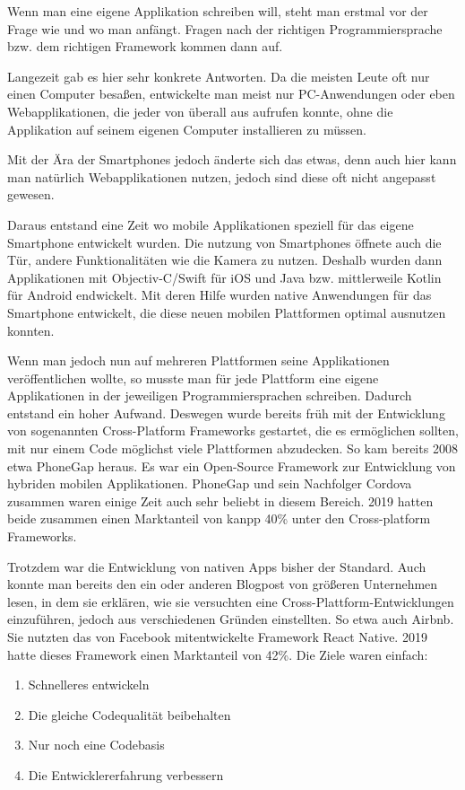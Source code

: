 Wenn man eine eigene Applikation schreiben will, steht man erstmal vor der Frage wie und wo man anfängt.
Fragen nach der richtigen Programmiersprache bzw. dem richtigen Framework kommen dann auf.

Langezeit gab es hier sehr konkrete Antworten. Da die meisten Leute oft nur einen Computer besaßen, entwickelte man meist nur PC-Anwendungen oder eben Webapplikationen, die jeder von überall aus aufrufen konnte, ohne die Applikation auf seinem eigenen Computer installieren zu müssen.

Mit der Ära der Smartphones jedoch änderte sich das etwas, denn auch hier kann man natürlich Webapplikationen nutzen, jedoch sind diese oft nicht angepasst gewesen.

Daraus entstand eine Zeit wo mobile Applikationen speziell für das eigene Smartphone entwickelt wurden. Die nutzung von Smartphones öffnete auch die Tür, andere Funktionalitäten wie die Kamera zu nutzen. Deshalb wurden dann Applikationen mit Objectiv-C/Swift für iOS und Java bzw. mittlerweile Kotlin für Android endwickelt. Mit deren Hilfe wurden native Anwendungen für das Smartphone entwickelt, die diese neuen mobilen Plattformen optimal ausnutzen konnten.

Wenn man jedoch nun auf mehreren Plattformen seine Applikationen veröffentlichen wollte, so musste man für jede Plattform eine eigene Applikationen in der jeweiligen Programmiersprachen schreiben. Dadurch entstand ein hoher Aufwand. Deswegen wurde bereits früh mit der Entwicklung von sogenannten Cross-Platform Frameworks gestartet, die es ermöglichen sollten, mit nur einem Code möglichst viele Plattformen abzudecken. So kam bereits 2008 etwa PhoneGap heraus. Es war ein Open-Source Framework zur Entwicklung von hybriden mobilen Applikationen. PhoneGap und sein Nachfolger Cordova zusammen waren einige Zeit auch sehr beliebt in diesem Bereich. 2019 hatten beide zusammen einen Marktanteil von kanpp 40\% unter den Cross-platform Frameworks.\cite{statist_CP_Framework}

Trotzdem war die Entwicklung von nativen Apps bisher der Standard. Auch konnte man bereits den ein oder anderen Blogpost von größeren Unternehmen lesen, in dem sie erklären, wie sie versuchten eine  Cross-Plattform-Entwicklungen einzuführen, jedoch aus verschiedenen Gründen einstellten. So etwa auch Airbnb. Sie nutzten das von Facebook mitentwickelte Framework React Native. 2019 hatte dieses Framework einen Marktanteil von 42\%. 
\break
Die Ziele waren einfach:
\begin{enumerate}
    \item Schnelleres entwickeln
    \item Die gleiche Codequalität beibehalten
    \item Nur noch eine Codebasis
    \item Die Entwicklererfahrung verbessern\cite{Airbnb_react_goals}
\end{enumerate}

